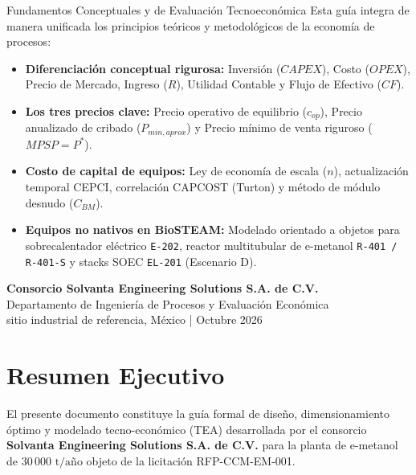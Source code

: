 \documentclass[11pt,letterpaper]{article}
\begin{document}
\begin{titlepage}
    \begin{academicbox}{Fundamentos Conceptuales y de Evaluación Tecnoeconómica}
        Esta guía integra de manera unificada los principios teóricos y metodológicos de la economía de procesos:
        \begin{itemize}[leftmargin=*]
            \item \textbf{Diferenciación conceptual rigurosa:} Inversión ($CAPEX$), Costo ($OPEX$), Precio de Mercado, Ingreso ($R$), Utilidad Contable y Flujo de Efectivo ($CF$).
            \item \textbf{Los tres precios clave:} Precio operativo de equilibrio ($c_{op}$), Precio anualizado de cribado ($P_{min,aprox}$) y Precio mínimo de venta riguroso ($MPSP = P^*$).
            \item \textbf{Costo de capital de equipos:} Ley de economía de escala ($n$), actualización temporal CEPCI, correlación CAPCOST (Turton) y método de módulo desnudo ($C_{BM}$).
            \item \textbf{Equipos no nativos en BioSTEAM:} Modelado orientado a objetos para sobrecalentador eléctrico \texttt{E-202}, reactor multitubular de e-metanol \texttt{R-401 / R-401-S} y stacks SOEC \texttt{EL-201} (Escenario D).
        \end{itemize}
    \end{academicbox}
    
    \vfill
    
    {\small\color{darkslate}\textbf{Consorcio Solvanta Engineering Solutions S.A. de C.V.}\\
    Departamento de Ingeniería de Procesos y Evaluación Económica\\
    sitio industrial de referencia, México | Octubre 2026}
\end{titlepage}

\tableofcontents
\newpage

\section{Resumen Ejecutivo}

El presente documento constituye la guía formal de diseño, dimensionamiento óptimo y modelado tecno-económico (TEA) desarrollada por el consorcio \textbf{Solvanta Engineering Solutions S.A. de C.V.} para la planta de e-metanol de $30\,000\text{ t/año}$ objeto de la licitación RFP-CCM-EM-001.
\end{document}
